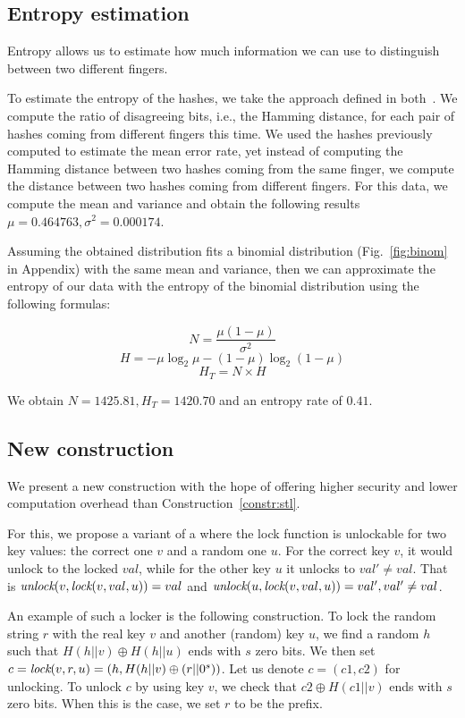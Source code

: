 \subsection{Entropy estimation}

Entropy allows us to estimate how much information we can use to distinguish between two different fingers. 

To estimate the entropy of the hashes, we take the approach defined in both~\cite{entropyfv,irisrfe}.
We compute the ratio of disagreeing bits, i.e., the Hamming distance, for each pair of hashes coming from different fingers this time. 
We used the hashes previously computed to estimate the mean error rate, yet instead of computing the Hamming distance between two hashes coming from the same finger, we compute the distance between two hashes coming from different fingers.
For this data, we compute the mean and variance and obtain the following results $\mu = 0.464763, \sigma^2 = 0.000174
$.


Assuming the obtained distribution fits a binomial distribution (Fig.~\ref{fig:binom} in Appendix) with the same mean and variance, then we can approximate the entropy of our data with the entropy of the binomial distribution using the following formulas:


$$ N = \frac{\mu(1-\mu)}{\sigma^2}$$
$$ H = -\mu \log_2\mu - (1-\mu)\log_2(1-\mu)$$
$$H_T = N\times H$$


We obtain $N = 1425.81, H_T = 1420.70$ and an entropy rate of $0.41$. 


\subsection{New construction}\label{subsec:pe}
We present a new construction with the hope of offering higher security and lower computation overhead than Construction~\ref{constr:stl}.

For this, we propose a variant of a \dl where the lock function is unlockable for two key values: the correct one $v$ and a random one $u$. For the correct key $v$, it would unlock to the locked $val$, while for the other key $u$ it unlocks to $val' \neq val$. That is $\textit{unlock}(v,\textit{lock}(v,val,u)) = val$ and  $\textit{unlock}(u,\textit{lock}(v,val,u)) = val', val' \neq val$.

An example of such a locker is the following construction. To lock the random string $r$ with the real key $v$ and another (random) key $u$, we find a random $h$ such that $H(h||v) \oplus H(h||u)$ ends with $s$ zero bits. We then set $c = \textit{lock}(v,r,u) = (h, H(h||v) \oplus (r||0^s))$. Let us denote $c = (c1, c2)$ for unlocking.
To unlock $c$ by using key $v$, we check that $c2 \oplus H(c1||v)$ ends with $s$ zero bits. When this is the case, we set $r$ to be the prefix.

